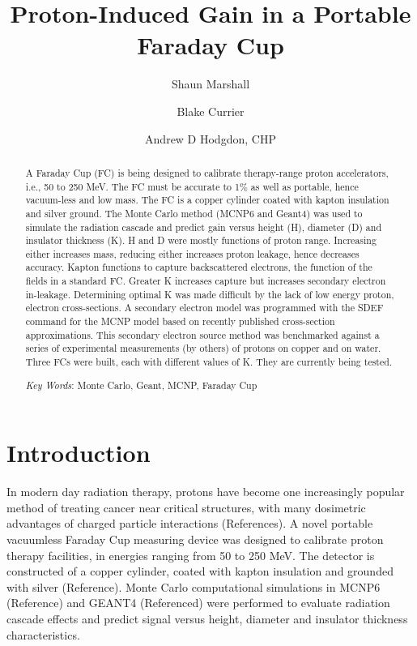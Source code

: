 \documentclass{mc2015}
\begin{document}
\title{Proton-Induced Gain in a Portable Faraday Cup}

\author{Shaun Marshall}
\author{Blake Currier}

\author{Andrew D Hodgdon, CHP}

\maketitle

\begin{abstract}
A Faraday Cup (FC) is being designed to calibrate therapy-range proton accelerators, i.e., 50 to 250 MeV. The FC must be accurate to 1\% as well as portable, hence vacuum-less and low mass. The FC is a copper cylinder coated with kapton insulation and silver ground. The Monte Carlo method (MCNP6 and Geant4) was used to simulate the radiation cascade and predict gain versus height (H), diameter (D) and insulator thickness (K). H and D were mostly functions of proton range. Increasing either increases mass, reducing either increases proton leakage, hence decreases accuracy. Kapton functions to capture backscattered electrons, the function of the fields in a standard FC. Greater K increases capture but increases secondary electron in-leakage. Determining optimal K was made difficult by the lack of low energy proton, electron cross-sections. A secondary electron model was programmed with the SDEF command for the MCNP model based on recently published cross-section approximations. This secondary electron source method was benchmarked against a series of experimental measurements (by others) of protons on copper and on water. Three FCs were built, each with different values of K. They are currently being tested. 

\emph{Key Words}: Monte Carlo, Geant, MCNP, Faraday Cup
\end{abstract}


\section{Introduction}

In modern day radiation therapy, protons have become one increasingly popular method of treating cancer near critical structures, with many dosimetric advantages of charged particle interactions (References). A novel portable vacuumless Faraday Cup measuring device was designed to calibrate proton therapy facilities, in energies ranging from 50 to 250 MeV. The detector is constructed of a copper cylinder, coated with kapton insulation and grounded with silver (Reference). Monte Carlo computational simulations in MCNP6 (Reference) and GEANT4 (Referenced) were performed to evaluate radiation cascade effects and predict signal versus height, diameter and insulator thickness characteristics.
\end{document}
